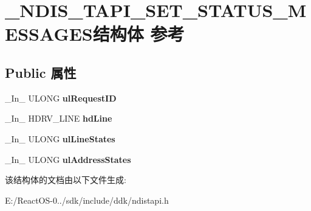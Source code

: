 \hypertarget{struct___n_d_i_s___t_a_p_i___s_e_t___s_t_a_t_u_s___m_e_s_s_a_g_e_s}{}\section{\+\_\+\+N\+D\+I\+S\+\_\+\+T\+A\+P\+I\+\_\+\+S\+E\+T\+\_\+\+S\+T\+A\+T\+U\+S\+\_\+\+M\+E\+S\+S\+A\+G\+E\+S结构体 参考}
\label{struct___n_d_i_s___t_a_p_i___s_e_t___s_t_a_t_u_s___m_e_s_s_a_g_e_s}
\subsection*{Public 属性}
\begin{DoxyCompactItemize}
\item 
\mbox{\label{struct___n_d_i_s___t_a_p_i___s_e_t___s_t_a_t_u_s___m_e_s_s_a_g_e_s_a60ab08f60a5c308e829363bac0375ad0}} 
\+\_\+\+In\+\_\+ U\+L\+O\+NG {\bfseries ul\+Request\+ID}
\item 
\mbox{\label{struct___n_d_i_s___t_a_p_i___s_e_t___s_t_a_t_u_s___m_e_s_s_a_g_e_s_a6b59c7b49231774873fd773172888cda}} 
\+\_\+\+In\+\_\+ H\+D\+R\+V\+\_\+\+L\+I\+NE {\bfseries hd\+Line}
\item 
\mbox{\label{struct___n_d_i_s___t_a_p_i___s_e_t___s_t_a_t_u_s___m_e_s_s_a_g_e_s_ac0c30401e5b05607506e6e33aa40a6bc}} 
\+\_\+\+In\+\_\+ U\+L\+O\+NG {\bfseries ul\+Line\+States}
\item 
\mbox{\label{struct___n_d_i_s___t_a_p_i___s_e_t___s_t_a_t_u_s___m_e_s_s_a_g_e_s_a0d4f3dd05939e416731644456668b077}} 
\+\_\+\+In\+\_\+ U\+L\+O\+NG {\bfseries ul\+Address\+States}
\end{DoxyCompactItemize}


该结构体的文档由以下文件生成\+:\begin{DoxyCompactItemize}
\item 
E\+:/\+React\+O\+S-\/0../sdk/include/ddk/ndistapi.\+h\end{DoxyCompactItemize}

